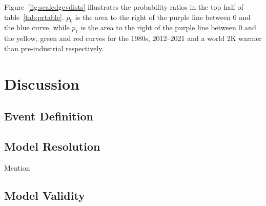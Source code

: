 Figure~\ref{fig:scaledgevdists} illustrates the probability ratios in the top half of table~\ref{tab:prtable}.
$p_0$ is the area to the right of the purple line between 0 and the blue curve,
    while $p_1$ is the area to the right of the purple line between 0 and the yellow, green and red curves for
    the 1980s, 2012--2021 and a world 2K warmer than pre-industrial respectively.


\section{Discussion}\label{sec:discussion}

\begin{comment}
This section should give a picture of what you have taken out of your
project and how you can put it into context.

This section should summarise the results obtained, detail conclusions
reached, suggest future work, and changes that you would make if you
repeated the project.
\end{comment}

\subsection{Event Definition}\label{subsec:diseventdef}



\subsection{Model Resolution}\label{subsec:dismodeldef}

Mention~\cite{Kendon_Fischer_Short_2023}

\subsection{Model Validity}\label{subsec:dismodelvalid}